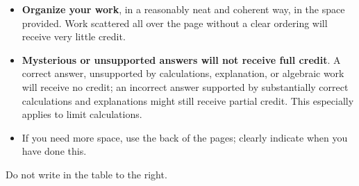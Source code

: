 \documentclass[11pt]{exam}
\theoremstyle{definition}
\begin{document}
\begin{minipage}[t]{3.7in}
\vspace{0pt}
\begin{itemize}


\item \textbf{Organize your work}, in a reasonably neat and coherent way, in
the space provided. Work scattered all over the page without a clear ordering will 
receive very little credit.  

\item \textbf{Mysterious or unsupported answers will not receive full
credit}.  A correct answer, unsupported by calculations, explanation,
or algebraic work will receive no credit; an incorrect answer supported
by substantially correct calculations and explanations might still receive
partial credit.  This especially applies to limit calculations.

\item If you need more space, use the back of the pages; clearly indicate when you have done this.

\end{itemize}

Do not write in the table to the right.
\end{minipage}
\hfill
\begin{minipage}[t]{2.3in}
\vspace{0pt}
\addpoints %
\gradetable[v]%

\end{minipage}
\newpage %

%
%
%
\end{document}
